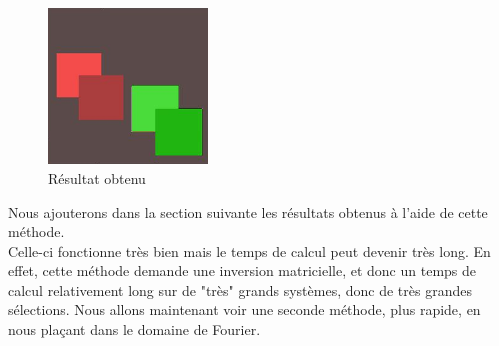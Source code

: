 \begin{figure}[!h]
    \centering
\includegraphics[width = 120pt]{Images/result.png}
\caption{Résultat obtenu}\hfill
\end{figure} 
Nous ajouterons dans la section suivante les résultats obtenus à l'aide de cette méthode. \\ Celle-ci fonctionne très bien mais le temps de calcul peut devenir très long. En effet, cette méthode demande une inversion matricielle, et donc un temps de calcul relativement long sur de "très" grands systèmes, donc de très grandes sélections. Nous allons maintenant voir une seconde méthode, plus rapide, en nous plaçant dans le domaine de Fourier.

